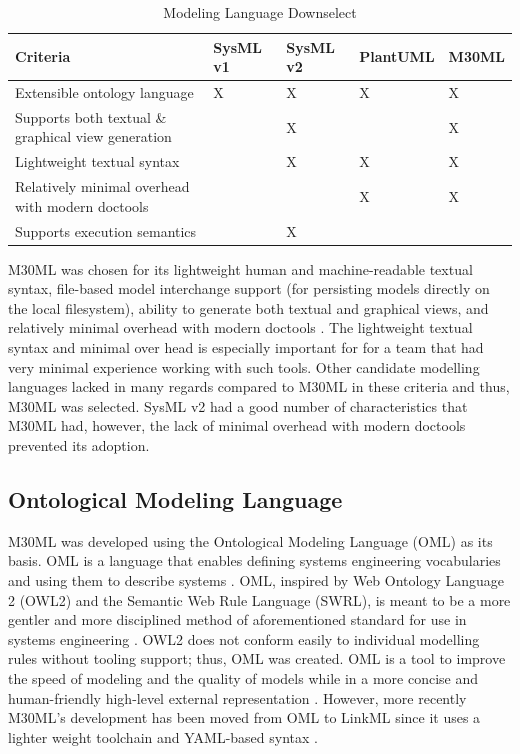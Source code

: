 \documentclass[journal,article,submit,pdftex,moreauthors]{Definitions/mdpi}
\begin{document}
\begin{table}[H] 
	\caption{Modeling Language Downselect}
	\label{tab:language}
	\begin{tabularx}{\textwidth}{CCCCC}
	\toprule
	\textbf{Criteria}  & \textbf{SysML v1}  & \textbf{SysML v2}  & \textbf{PlantUML}  & \textbf{M30ML}\\
	\midrule
	Extensible ontology language                       & X        & X        & X        & X     \\ \hline
	Supports both textual \& graphical view generation &          & X        &          & X     \\ \hline
	Lightweight textual syntax                         &          & X        & X        & X     \\ \hline
	Relatively minimal overhead with modern doctools   &          &          & X        & X     \\ \hline
	Supports execution semantics                       &          & X        &          &       \\
	\bottomrule
	\end{tabularx}
\end{table}

M30ML was chosen for its lightweight human and machine-readable textual syntax, file-based model interchange support (for persisting models directly on the local filesystem), ability to generate both textual and graphical views, and relatively minimal overhead with modern doctools \cite{mach30_git}.  The lightweight textual syntax and minimal over head is especially important for for a team that had very minimal experience working with such tools.  Other candidate modelling languages lacked in many regards compared to M30ML in these criteria and thus, M30ML was selected.  SysML v2 had a good number of characteristics that M30ML had, however, the lack of minimal overhead with modern doctools prevented its adoption.  

\subsection{Ontological Modeling Language}
M30ML was developed using the Ontological Modeling Language (OML) as its basis.  OML is a language that enables defining systems engineering vocabularies and using them to describe systems \cite{oml_language}.  OML, inspired by Web Ontology Language 2 (OWL2) and the Semantic Web Rule Language (SWRL), is meant to be a more gentler and more disciplined method of aforementioned standard for use in systems engineering \cite{oml_language}.  OWL2 does not conform easily to individual modelling rules without tooling support; thus, OML was created.  OML is a tool to improve the speed of modeling and the quality of models while in a more concise and human-friendly high-level external representation \cite{oml_origin_and_rationale}.  However, more recently M30ML's development has been moved from OML to LinkML since it uses a lighter weight toolchain and YAML-based syntax \cite{linkml}.  
\end{document}
